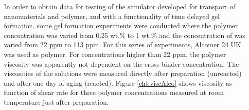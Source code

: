 \documentclass[energies,article,submit,moreauthors,pdftex]{Definitions/mdpi}
\begin{document}
In order to obtain data for testing of the simulator developed for transport of nanomaterials and polymer, and with a functionality of time delayed gel formation, some gel formation experiments were conducted where the polymer concentration was varied from 0.25 wt.\% to 1 wt.\% and the concentration of  was varied from 22 ppm to 113 ppm. For this series of experiments, Alcomer 24 UK was used as polymer. For concentrations higher than 22 ppm, the polymer viscosity was apparently not dependent on the cross-binder concentration. The viscosities of the solutions were measured directly after preparation (unreacted) and after one day of aging (reacted). Figure \ref{cht:viscAlco} shows viscosity as function of shear rate for three polymer concentrations measured at room temperature just after preparation.
\end{document}
